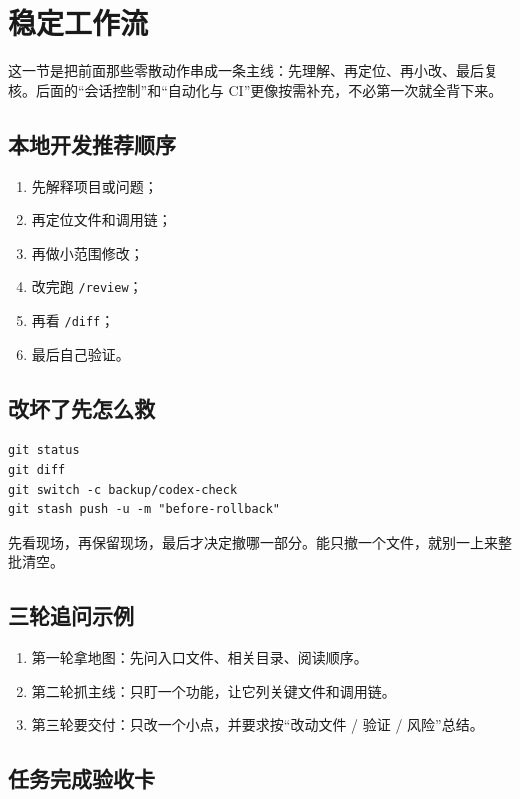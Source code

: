 \documentclass[UTF8,a4paper,11pt]{ctexart}
\begin{document}
\section{稳定工作流}

这一节是把前面那些零散动作串成一条主线：先理解、再定位、再小改、最后复核。后面的“会话控制”和“自动化与 CI”更像按需补充，不必第一次就全背下来。

\subsection{本地开发推荐顺序}

\begin{enumerate}
  \item 先解释项目或问题；
  \item 再定位文件和调用链；
  \item 再做小范围修改；
  \item 改完跑 \texttt{/review}；
  \item 再看 \texttt{/diff}；
  \item 最后自己验证。
\end{enumerate}

\subsection{改坏了先怎么救}

\begin{lstlisting}[style=cli]
git status
git diff
git switch -c backup/codex-check
git stash push -u -m "before-rollback"
\end{lstlisting}

先看现场，再保留现场，最后才决定撤哪一部分。能只撤一个文件，就别一上来整批清空。

\subsection{三轮追问示例}

\begin{enumerate}
  \item 第一轮拿地图：先问入口文件、相关目录、阅读顺序。
  \item 第二轮抓主线：只盯一个功能，让它列关键文件和调用链。
  \item 第三轮要交付：只改一个小点，并要求按“改动文件 / 验证 / 风险”总结。
\end{enumerate}

\subsection{任务完成验收卡}
\end{document}
